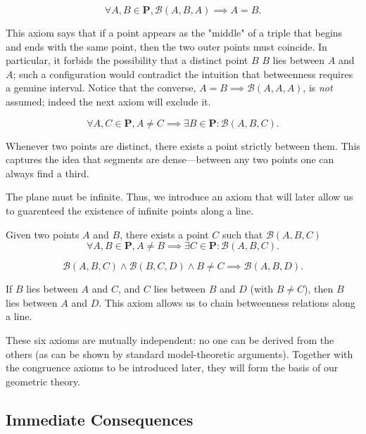 \documentclass[../../../main/main.tex]{subfiles}
\begin{document}
\begin{axiom}
    \[
    \forall A, B \in \mathbf{P}, \mathcal{B}(A, B, A) \implies A = B.
    \]
\end{axiom}
\noindent
This axiom says that if a point appears as the "middle" of a triple that begins and ends with the same point, then the two outer points must coincide. In particular, it forbids the possibility that a distinct point $B$ $B$ lies between $A$ and $A$; such a configuration would contradict the intuition that betweenness requires a genuine interval. Notice that the converse, $A=B\implies\mathcal{B}(A,A,A)$, is \emph{not} assumed; indeed the next axiom will exclude it.

\begin{axiom}[Density]
\[
\forall A,C \in \mathbf{P}, A \neq C \implies \exists B \in \mathbf{P} \colon \mathcal{B}(A,B,C).
\]
\end{axiom}
\noindent
Whenever two points are distinct, there exists a point strictly between
them.  This captures the idea that segments are dense—between any two
points one can always find a third.

The plane must be infinite. Thus, we introduce an axiom that will later allow us to guarenteed the existence of infinite points along a line.
\begin{axiom}[Extensibility]\label{ax-extensibility}
    Given two points $A$ and $B$, there exists a point $C$ such that $\mathcal{B}(A,B,C)$
    \[
    \forall A,B \in \mathbf{P}, A \neq B \implies \exists C \in \mathbf{P} \colon \mathcal{B}(A,B,C).
    \]
\end{axiom}

\begin{axiom}
    \[
    \mathcal{B}(A,B,C) \land \mathcal{B}(B,C,D) \land B \neq C \implies \mathcal{B}(A,B,D).
    \]
\end{axiom}
If $B$ lies between $A$ and $C$, and $C$ lies between $B$ and $D$ (with $B\neq C$), then $B$ lies between $A$ and $D$. This axiom allows us to chain betweenness relations along a line.

These six axioms are mutually independent: no one can be derived from the others (as can be shown by standard model-theoretic arguments). Together with the congruence axioms to be introduced later, they will form the basis of our geometric theory.

\subsection{Immediate Consequences}
\end{document}
